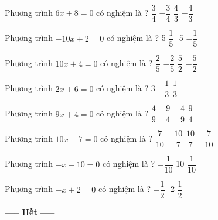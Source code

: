 \begin{ex} 
	Phương trình $6x+8=0$ có nghiệm là ? 
	\choice
	{$ \dfrac{ 3 }{ 4 } $}
	{$- \dfrac{ 3 }{ 4 } $}
	{$ \dfrac{ 4 }{ 3 } $}
	{\True $- \dfrac{ 4 }{ 3 } $}
	\loigiai{} 
\end{ex}

\begin{ex} 
	Phương trình $-10x+2=0$ có nghiệm là ? 
	\choice
	{5}
	{\True $ \dfrac{ 1 }{ 5 } $}
	{-5}
	{$- \dfrac{ 1 }{ 5 } $}
	\loigiai{} 
\end{ex}

\begin{ex} 
	Phương trình $10x+4=0$ có nghiệm là ? 
	\choice
	{$ \dfrac{ 2 }{ 5 } $}
	{\True $- \dfrac{ 2 }{ 5 } $}
	{$ \dfrac{ 5 }{ 2 } $}
	{$- \dfrac{ 5 }{ 2 } $}
	\loigiai{} 
\end{ex}

\begin{ex} 
	Phương trình $2x+6=0$ có nghiệm là ? 
	\choice
	{3}
	{$- \dfrac{ 1 }{ 3 } $}
	{}
	{$ \dfrac{ 1 }{ 3 } $}
	\loigiai{} 
\end{ex}

\begin{ex} 
	Phương trình $9x+4=0$ có nghiệm là ? 
	\choice
	{$ \dfrac{ 4 }{ 9 } $}
	{$- \dfrac{ 9 }{ 4 } $}
	{\True $- \dfrac{ 4 }{ 9 } $}
	{$ \dfrac{ 9 }{ 4 } $}
	\loigiai{} 
\end{ex}

\begin{ex} 
	Phương trình $10x-7=0$ có nghiệm là ? 
	\choice
	{\True $ \dfrac{ 7 }{ 10 } $}
	{$- \dfrac{ 10 }{ 7 } $}
	{$ \dfrac{ 10 }{ 7 } $}
	{$- \dfrac{ 7 }{ 10 } $}
	\loigiai{} 
\end{ex}

\begin{ex} 
	Phương trình $-x-10=0$ có nghiệm là ? 
	\choice
	{$- \dfrac{ 1 }{ 10 } $}
	{10}
	{}
	{$ \dfrac{ 1 }{ 10 } $}
	\loigiai{} 
\end{ex}

\begin{ex} 
	Phương trình $-x+2=0$ có nghiệm là ? 
	\choice
	{$- \dfrac{ 1 }{ 2 } $}
	{-2}
	{$ \dfrac{ 1 }{ 2 } $}
	{}
	\loigiai{} 
\end{ex}
\begin{center}\bf
	----- Hết -----
\end{center}